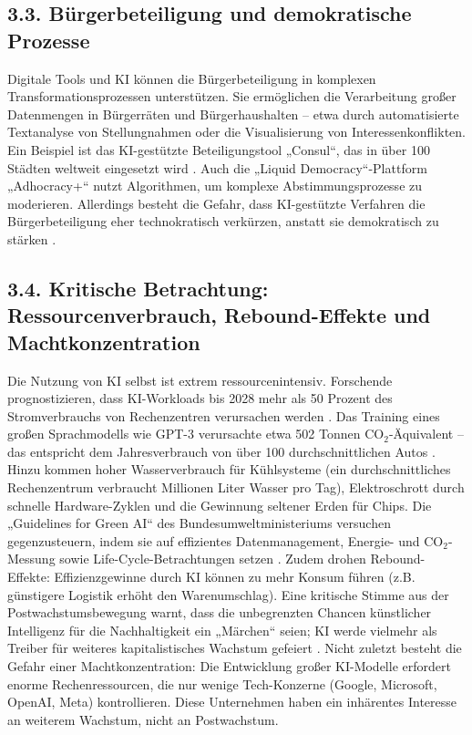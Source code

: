 \documentclass[12pt, a4paper]{article}
\begin{document}
	\subsection*{3.3. Bürgerbeteiligung und demokratische Prozesse}
	Digitale Tools und KI können die Bürgerbeteiligung in komplexen Transformationsprozessen
	unterstützen.
	Sie ermöglichen die Verarbeitung großer Datenmengen in Bürgerräten und
	Bürgerhaushalten – etwa durch automatisierte Textanalyse von Stellungnahmen oder
	die Visualisierung von Interessenkonflikten.
	Ein Beispiel ist das KI-gestützte
	Beteiligungstool „Consul“, das in über 100 Städten weltweit eingesetzt wird
	\cite{ki-buergerbeteiligung}.
	Auch die „Liquid Democracy“-Plattform „Adhocracy+“
	nutzt Algorithmen, um komplexe Abstimmungsprozesse zu moderieren.
	Allerdings besteht
	die Gefahr, dass KI-gestützte Verfahren die Bürgerbeteiligung eher technokratisch
	verkürzen, anstatt sie demokratisch zu stärken \cite{ki-demokratie2024}.
	
	\subsection*{3.4. Kritische Betrachtung: Ressourcenverbrauch, Rebound-Effekte und Machtkonzentration}
	Die Nutzung von KI selbst ist extrem ressourcenintensiv.
	Forschende prognostizieren,
	dass KI-Workloads bis 2028 mehr als 50 Prozent des Stromverbrauchs von Rechenzentren
	verursachen werden \cite{ki-ressourcen2025}.
	Das Training eines großen Sprachmodells
	wie GPT-3 verursachte etwa 502 Tonnen CO$_2$-Äquivalent – das entspricht dem
	Jahresverbrauch von über 100 durchschnittlichen Autos \cite{strubell2019}.
	Hinzu kommen
	hoher Wasserverbrauch für Kühlsysteme (ein durchschnittliches Rechenzentrum verbraucht
	Millionen Liter Wasser pro Tag), Elektroschrott durch schnelle Hardware-Zyklen und
	die Gewinnung seltener Erden für Chips.
	Die „Guidelines for Green AI“ des
	Bundesumweltministeriums versuchen gegenzusteuern, indem sie auf effizientes
	Datenmanagement, Energie- und CO$_2$-Messung sowie Life-Cycle-Betrachtungen setzen
	\cite{greenai2025b}.
	Zudem drohen Rebound-Effekte: Effizienzgewinne durch KI können
	zu mehr Konsum führen (z.B. günstigere Logistik erhöht den Warenumschlag).
	Eine
	kritische Stimme aus der Postwachstumsbewegung warnt, dass die unbegrenzten Chancen
	künstlicher Intelligenz für die Nachhaltigkeit ein „Märchen“ seien;
	KI werde vielmehr
	als Treiber für weiteres kapitalistisches Wachstum gefeiert \cite{postwachstumKI2}.
	Nicht zuletzt besteht die Gefahr einer Machtkonzentration: Die Entwicklung großer
	KI-Modelle erfordert enorme Rechenressourcen, die nur wenige Tech-Konzerne (Google,
	Microsoft, OpenAI, Meta) kontrollieren.
	Diese Unternehmen haben ein inhärentes
	Interesse an weiterem Wachstum, nicht an Postwachstum.
	
\end{document}
